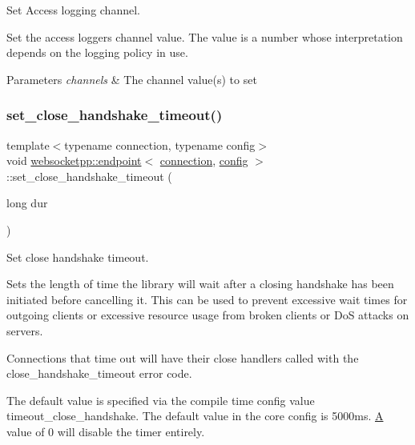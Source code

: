 Set Access logging channel. 

Set the access logger\textquotesingle{}s channel value. The value is a number whose interpretation depends on the logging policy in use.


\begin{DoxyParams}{Parameters}
{\em channels} & The channel value(s) to set \\
\hline
\end{DoxyParams}
\mbox{\label{classwebsocketpp_1_1endpoint_a54caf799e1cf531d26f67999068d483b}} 
\subsubsection{\texorpdfstring{set\+\_\+close\+\_\+handshake\+\_\+timeout()}{set\_close\_handshake\_timeout()}}
{\footnotesize\ttfamily template$<$typename connection, typename config$>$ \\
void \mbox{\hyperlink{classwebsocketpp_1_1endpoint}{websocketpp\+::endpoint}}$<$ \mbox{\hyperlink{classwebsocketpp_1_1connection}{connection}}, \mbox{\hyperlink{classconfig}{config}} $>$\+::set\+\_\+close\+\_\+handshake\+\_\+timeout (\begin{DoxyParamCaption}\item[{long}]{dur }\end{DoxyParamCaption})\hspace{0.3cm}{\ttfamily [inline]}}



Set close handshake timeout. 

Sets the length of time the library will wait after a closing handshake has been initiated before cancelling it. This can be used to prevent excessive wait times for outgoing clients or excessive resource usage from broken clients or DoS attacks on servers.

Connections that time out will have their close handlers called with the close\+\_\+handshake\+\_\+timeout error code.

The default value is specified via the compile time config value \textquotesingle{}timeout\+\_\+close\+\_\+handshake\textquotesingle{}. The default value in the core config is 5000ms. \mbox{\hyperlink{struct_a}{A}} value of 0 will disable the timer entirely.

